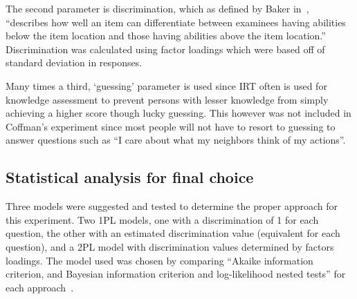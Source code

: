 \documentclass{sig-alternate}
\begin{document}
The second parameter is discrimination, which as defined by Baker in~\cite{irt:2001}, ``describes how well an item can differentiate between examinees having abilities below the item location and those having abilities above the item location.'' Discrimination was calculated using factor loadings which were based off of standard deviation in responses.

Many times a third, `guessing' parameter is used since IRT often is used for knowledge assessment to prevent persons with lesser knowledge from simply achieving a higher score though lucky guessing. This however was not included in Coffman's experiment since most people will not have to resort to guessing to answer questions such as ``I care about what my neighbors think of my actions''.

\subsection{Statistical analysis for final choice}
\label{sec:irtModel}
Three models were suggested and tested to determine the proper approach for this experiment. Two 1PL models, one with a discrimination of 1 for each question, the other with an estimated discrimination value (equivalent for each question), and a 2PL model with discrimination values determined by factors loadings. The model used was chosen by comparing ``Akaike information criterion, and Bayesian information criterion and log-likelihood nested tests'' for each approach~\cite{disparities:2009}.
\end{document}
